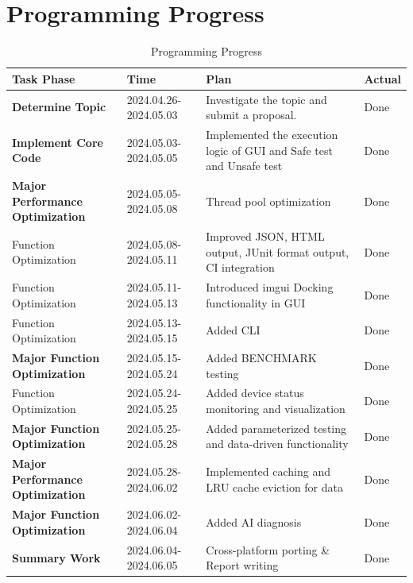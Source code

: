 \documentclass{article}
\begin{document}
\section{Programming Progress}
\begin{table}[H]
    \centering
    \begin{tabular}{|m{5cm}|m{2cm}|m{5cm}|m{3cm}|}
        \toprule
        \textbf{Task Phase}                     & \textbf{Time}         & \textbf{Plan}                                                        & \textbf{Actual } \\ \midrule
        \textbf{Determine Topic}                & 2024.04.26-2024.05.03 & Investigate the topic and submit a proposal.                         & Done             \\ \midrule
        \textbf{Implement Core Code}            & 2024.05.03-2024.05.05 & Implemented the execution logic of GUI and Safe test and Unsafe test & Done             \\ \midrule
        \textbf{Major Performance Optimization} & 2024.05.05-2024.05.08 & Thread pool optimization                                             & Done             \\ \midrule
        Function Optimization                   & 2024.05.08-2024.05.11 & Improved JSON, HTML output, JUnit format output, CI integration      & Done             \\ \midrule
        Function Optimization                   & 2024.05.11-2024.05.13 & Introduced imgui Docking functionality in GUI                        & Done             \\ \midrule
        Function Optimization                   & 2024.05.13-2024.05.15 & Added CLI                                                            & Done             \\ \midrule
        \textbf{Major Function Optimization}    & 2024.05.15-2024.05.24 & Added BENCHMARK testing                                              & Done             \\ \midrule
        Function Optimization                   & 2024.05.24-2024.05.25 & Added device status monitoring and visualization                     & Done             \\ \midrule
        \textbf{Major Function Optimization}    & 2024.05.25-2024.05.28 & Added parameterized testing and data-driven functionality            & Done             \\ \midrule
        \textbf{Major Performance Optimization} & 2024.05.28-2024.06.02 & Implemented caching and LRU cache eviction for data                  & Done             \\ \midrule
        \textbf{Major Function Optimization}    & 2024.06.02-2024.06.04 & Added AI diagnosis                                                   & Done             \\ \midrule
        \textbf{Summary Work}                   & 2024.06.04-2024.06.05 & Cross-platform porting \& Report writing                             & Done             \\
        \bottomrule
    \end{tabular}
    \caption{Programming Progress}
\end{table}
\end{document}
